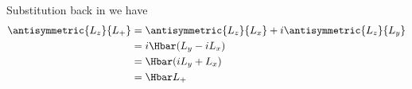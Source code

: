 %
Substitution back in  we have
%
\begin{equation}\label{eqn:lecture5BigReviewAngularMomentum:5360}
\begin{aligned}
\antisymmetric{L_z}{L_{+}}
&=
\antisymmetric{L_z}{L_x}
+ i \antisymmetric{L_z}{L_y}  \\
&=
i \Hbar ( L_y - i L_x ) \\
&=
\Hbar ( i L_y +  L_x ) \\
&=
\Hbar L_{+}
\end{aligned}
\end{equation}
